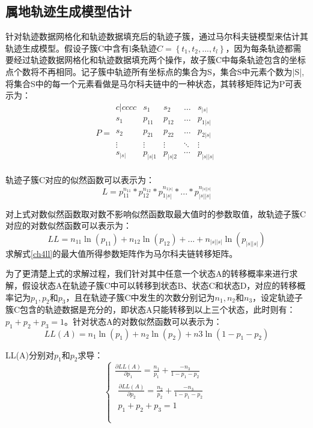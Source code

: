 \subsection{属地轨迹生成模型估计}
针对轨迹数据网格化和轨迹数据填充后的轨迹子簇，通过马尔科夫链模型来估计其轨迹生成模型。假设子簇C中含有l条轨迹$C=\left\{ t_1,t_2,...,t_l \right\} $，因为每条轨迹都需要经过轨迹数据网格化和轨迹数据填充两个操作，故子簇C中每条轨迹包含的坐标点个数将不再相同。记子簇中轨迹所有坐标点的集合为S，集合S中元素个数为|S|,将集合S中的每一个元素看做是马尔科夫链中的一种状态，其转移矩阵记为P可表示为：
\begin{equation}
\label{transitionmatrix}
P=\begin{matrix}{c|cccc}
	&		s_1&		s_2&		\dots&		s_{|s|}\\
	\hline
	s_1&		p_{11}&		p_{12}&		\dots&		p_{1|s|}\\
	s_2&		p_{21}&		p_{22}&		\dots&		p_{2|s|}\\
	\vdots&		\vdots&		\vdots&		\ddots&		\vdots\\
	s_{|s|}&		p_{|s|1}&		p_{|s|2}&		\cdots&		p_{|s||s|}\\
\end{matrix}
\end{equation}

轨迹子簇C对应的似然函数可以表示为：
\[
L=p_{11}^{n_{11}}*p_{12}^{n_{12}}*p_{1|s|}^{n_{1|s|}}*...*p_{|s||s|}^{n_{|s||s|}}
\]

对上式对数似然函数取对数不影响似然函数取最大值时的参数取值，故轨迹子簇C对应的对数似然函数可以表示为：
\begin{equation}
\label{ch4ll}
LL=n_{11}\ln \left( p_{11} \right) +n_{12}\ln \left( p_{12} \right) +...+n_{|s||s|}\ln \left( p_{|s||s|} \right) 
\end{equation}
求解式\ref{ch4ll}的最大值所得参数矩阵作为马尔科夫链转移矩阵。

为了更清楚上式的求解过程，我们针对其中任意一个状态A的转移概率来进行求解，假设状态A在轨迹子簇C中可以转移到状态B、状态C和状态D，对应的转移概率记为$p_1,p_2和p_3$，且在轨迹子簇C中发生的次数分别记为$n_1,n_2和n_3$，设定轨迹子簇C包含的轨迹数据是充分的，即状态A只能转移到以上三个状态，此时则有：$p_1+p_2+p_3=1$。针对状态A的对数似然函数可以表示为：
\[
LL\left( A \right) =n_1\ln \left( p_1 \right) +n_2\ln \left( p_2 \right) +n3\ln \left( 1-p_1-p_2 \right) 
\]

LL(A)分别对$p_1$和$p_2$求导：
\[
\begin{cases}
	\frac{\partial LL\left( A \right)}{\partial p_1}=\frac{n_1}{p_1}+\frac{-n_3}{1-p_1-p_2}\\
	\begin{array}{c}
	\frac{\partial LL\left( A \right)}{\partial p_2}=\frac{n_2}{p_2}+\frac{-n_3}{1-p_1-p_2}\\
	p_1+p_2+p_3=1\\
\end{array}\\
\end{cases}
\]

